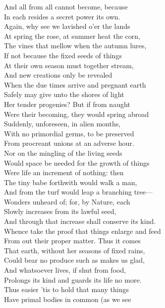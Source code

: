 And all from all cannot become, because\\
In each resides a secret power its own.\\
Again, why see we lavished o'er the lands\\
At spring the rose, at summer heat the corn,\\
The vines that mellow when the autumn lures,\\
If not because the fixed seeds of things\\
At their own season must together stream,\\
And new creations only be revealed\\
When the due times arrive and pregnant earth\\
Safely may give unto the shores of light\\
Her tender progenies? But if from naught\\
Were their becoming, they would spring abroad\\
Suddenly, unforeseen, in alien months,\\
With no primordial germs, to be preserved\\
From procreant unions at an adverse hour.\\
Nor on the mingling of the living seeds\\
Would space be needed for the growth of things\\
Were life an increment of nothing: then\\
The tiny babe forthwith would walk a man,\\
And from the turf would leap a branching tree—\\
Wonders unheard of; for, by Nature, each\\
Slowly increases from its lawful seed,\\
And through that increase shall conserve its kind.\\
Whence take the proof that things enlarge and feed\\
From out their proper matter. Thus it comes\\
That earth, without her seasons of fixed rains,\\
Could bear no produce such as makes us glad,\\
And whatsoever lives, if shut from food,\\
Prolongs its kind and guards its life no more.\\
Thus easier 'tis to hold that many things\\
Have primal bodies in common (as we see\\
